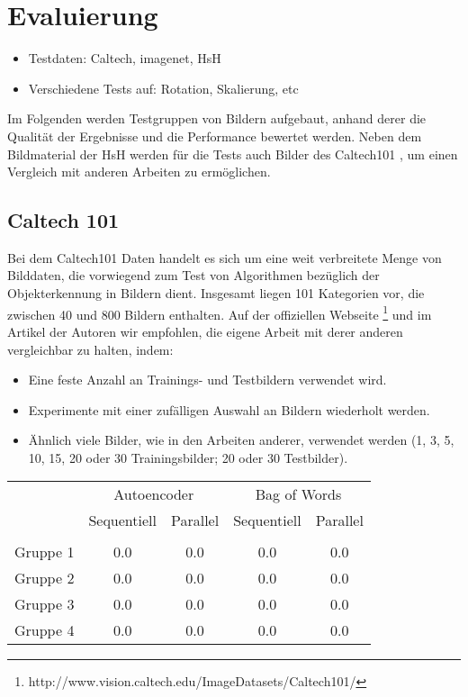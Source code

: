 \chapter{Evaluierung}

\begin{itemize}
	\item Testdaten: Caltech, imagenet, HsH
	\item Verschiedene Tests auf: Rotation, Skalierung, etc
\end{itemize}

Im Folgenden werden Testgruppen von Bildern aufgebaut, anhand derer die Qualität der Ergebnisse und die Performance bewertet werden. Neben dem Bildmaterial der HsH werden für die Tests auch Bilder des Caltech101 \cite{cal2004}, um einen Vergleich mit anderen Arbeiten zu ermöglichen.

\section{Caltech 101}

Bei dem Caltech101 Daten handelt es sich um eine weit verbreitete Menge von Bilddaten, die vorwiegend zum Test von Algorithmen bezüglich der Objekterkennung in Bildern dient. Insgesamt liegen 101 Kategorien vor, die zwischen 40 und 800 Bildern enthalten. Auf der offiziellen Webseite \footnote{http://www.vision.caltech.edu/Image\textunderscore Datasets/Caltech101/} und im Artikel der Autoren wir empfohlen, die eigene Arbeit mit derer anderen vergleichbar zu halten, indem:

\begin{itemize}
	\item Eine feste Anzahl an Trainings- und Testbildern verwendet wird.
	\item Experimente mit einer zufälligen Auswahl an Bildern wiederholt werden.
	\item Ähnlich viele Bilder, wie in den Arbeiten anderer, verwendet werden (1, 3, 5, 10, 15, 20 oder 30 Trainingsbilder; 20 oder 30 Testbilder).
\end{itemize}

\begin{center}
    \begin{tabular}{l c c c c}
     		 & \multicolumn{2}{c}{Autoencoder} & \multicolumn{2}{c}{Bag of Words}  \\
    	     & Sequentiell & Parallel 	& Sequentiell  & Parallel  		\\ \hline
    	     															\\[-0.9em] 
    Gruppe 1 & 0.0		   & 0.0		& 0.0		   & 0.0			\\     
    Gruppe 2 & 0.0		   & 0.0		& 0.0		   & 0.0			\\ 
    Gruppe 3 & 0.0		   & 0.0	 	& 0.0		   & 0.0			\\ 
    Gruppe 4 & 0.0		   & 0.0		& 0.0		   & 0.0			\\
    \end{tabular}
\end{center}

